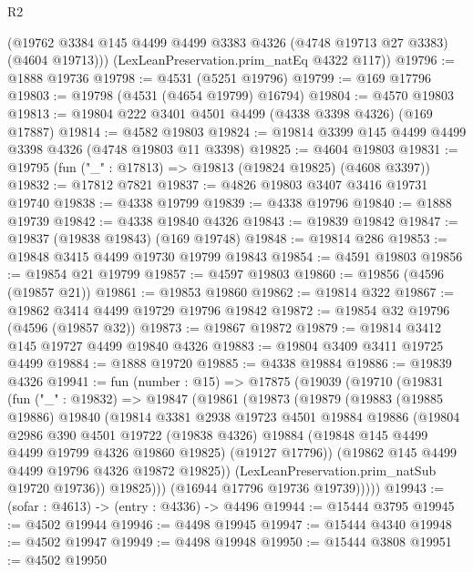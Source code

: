 \begin{lexlean}{R2}
\begin{coremodule}
        (@19762 @3384 @145 @4499 @4499 @3383 @4326 (@4748 @19713 @27 @3383) (@4604 @19713)))
      (LexLeanPreservation.prim_natEq @4322 @117))
@19796 := @1888 @19736
@19798 := @4531 (@5251 @19796)
@19799 := @169 @17796
@19803 := @19798 (@4531 (@4654 @19799) @16794)
@19804 := @4570 @19803
@19813 := @19804 @222 @3401 @4501 @4499 (@4338 @3398 @4326) (@169 @17887)
@19814 := @4582 @19803
@19824 := @19814 @3399 @145 @4499 @4499 @3398 @4326 (@4748 @19803 @11 @3398)
@19825 := @4604 @19803
@19831 := @19795 (fun ("_" : @17813) => @19813 (@19824 @19825) (@4608 @3397))
@19832 := @17812 @7821
@19837 := @4826 @19803 @3407 @3416 @19731 @19740
@19838 := @4338 @19799
@19839 := @4338 @19796
@19840 := @1888 @19739
@19842 := @4338 @19840 @4326
@19843 := @19839 @19842
@19847 := @19837 (@19838 @19843) (@169 @19748)
@19848 := @19814 @286
@19853 := @19848 @3415 @4499 @19730 @19799 @19843
@19854 := @4591 @19803
@19856 := @19854 @21 @19799
@19857 := @4597 @19803
@19860 := @19856 (@4596 (@19857 @21))
@19861 := @19853 @19860
@19862 := @19814 @322
@19867 := @19862 @3414 @4499 @19729 @19796 @19842
@19872 := @19854 @32 @19796 (@4596 (@19857 @32))
@19873 := @19867 @19872
@19879 := @19814 @3412 @145 @19727 @4499 @19840 @4326
@19883 := @19804 @3409 @3411 @19725 @4499
@19884 := @1888 @19720
@19885 := @4338 @19884
@19886 := @19839 @4326
@19941 := fun (number : @15) =>
  @17875
    (@19039
      (@19710
        (@19831
          (fun ("_" : @19832) =>
          @19847
            (@19861
              (@19873
                (@19879
                  (@19883
                    (@19885 @19886)
                    @19840
                    (@19814
                      @3381
                      @2938
                      @19723
                      @4501
                      @19884
                      @19886
                      (@19804
                        @2986
                        @390
                        @4501
                        @19722
                        (@19838 @4326)
                        @19884
                        (@19848 @145 @4499 @4499 @19799 @4326 @19860 @19825)
                        (@19127 @17796))
                      (@19862 @145 @4499 @4499 @19796 @4326 @19872 @19825))
                    (LexLeanPreservation.prim_natSub @19720 @19736))
                  @19825)))
            (@16944 @17796 @19736 @19739)))))
@19943 := (sofar : @4613) -> (entry : @4336) -> @4496
@19944 := @15444 @3795
@19945 := @4502 @19944
@19946 := @4498 @19945
@19947 := @15444 @4340
@19948 := @4502 @19947
@19949 := @4498 @19948
@19950 := @15444 @3808
@19951 := @4502 @19950

\end{coremodule}
\end{lexlean}
